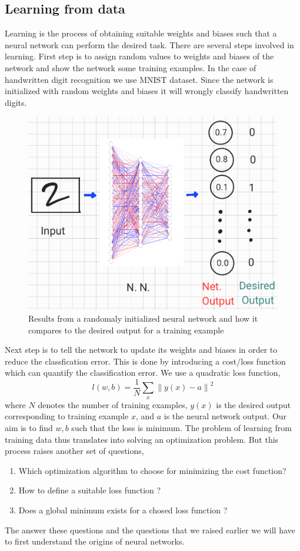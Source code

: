 \subsection{Learning from data}
Learning is the process of obtaining suitable weights and biases such that a neural network can perform
the desired task. There are several steps involved in learning. First step is to assign random values to 
weights and biases of the network and show the network some training examples. In the case of handwritten digit recognition
we use MNIST dataset. Since the network is initialized with random weights and biases it will wrongly classify handwritten digits. 
\begin{figure}[htbp]
    \centering
    \includegraphics[width=.4\textwidth]{Figures/rand_inp.png}
    \caption{Results from a randomaly initialized neural network and how it compares to the desired output for a training example}
    \label{fig:randinp}
\end{figure} 
Next step is to tell the network to update its weights and biases in order to reduce the classfication error. This is done by introducing a 
cost/loss function which can quantify the classification error. We use a quadratic loss function, 
$$l(w,b) = \frac{1}{N} \sum_x {\|y(x) - a\|}^2$$
where $N$ denotes the number of training examples, $y(x)$ is the desired output corresponding to training example $x$, and 
$a$ is the neural network output. Our aim is to find $w,b$ such that the loss is minimum. The problem of learning from training data thus translates into
solving an optimization problem. But this process raises another set of questions,
\begin{enumerate}
    \item Which optimization algorithm to choose for minimizing the cost function?
    \item How to define a suitable loss function ?
    \item Does a global minimum exists for a chosed loss function ?
\end{enumerate}
The answer these questions and the questions that we raised earlier we will have to first understand the origins of neural networks.
